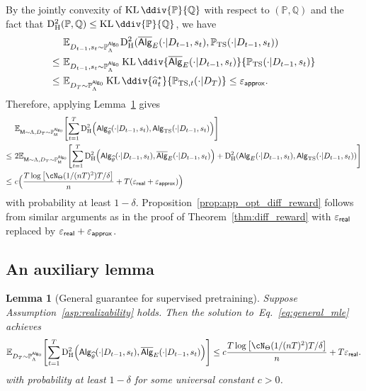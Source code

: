 \documentclass[10pt]{article}
\newtheorem{lemma}[theorem]{Lemma}
\renewcommand{\epsilon}{\varepsilon}
\newcommand{\eps}{\varepsilon}
\newcommand{\KL}{\operatorname{KL}\ddiv}
\newcommand{\<}{\left\langle}
\renewcommand{\>}{\right\rangle}
\newcommand{\paren}[1]{{\left( #1 \right)}}
\newcommand{\brac}[1]{{\left[ #1 \right]}}
\newcommand{\E}{\mathbb{E}}
\renewcommand{\P}{\mathbb{P}}
\newcommand{\Q}{\mathbb{Q}}
\newcommand{\inst}{{\mathsf{M}}}
\newcommand{\HelDs}{{\mathrm{D}^2_{\mathrm{H}}}}
\newcommand{\TS}{{\mathrm{TS}}}
\newcommand{\state}{{s}}
\newcommand{\action}{{a}}
\newcommand{\totlen}{{T}}
\newcommand{\sAlg}{{\mathsf{Alg}}}
\newcommand{\osAlg}{\overline{\mathsf{Alg}}}
\newcommand{\dset}{{D}}
\newcommand{\Numobs}{{n}}
\newcommand{\Parspace}{{\Theta}}
\newcommand{\appeps}{\eps_{{\mathsf{approx}}}}
\newcommand{\EstPar}{{\widehat{\theta}}}
\newcommand{\prior}{{\Lambda}}
\newcommand{\shortexp}{{E}}
\newcommand{\geneps}{{\epsilon}_{\sf real}}
\begin{document}
By the jointly convexity of $\KL{\P}{\Q}$ with respect to $(\P,\Q)$ and the fact that $\HelDs(\P,\Q)\leq\KL{\P}{\Q}$, we have 
\begin{align*}
  &~\E_{\dset_{t-1},\state_t\sim\P_\prior^{\sAlg_0}}\HelDs(\osAlg_{\shortexp}(\cdot|\dset_{t-1},\state_t),\P_{\TS}(\cdot|\dset_{t-1},\state_t))\\
  \leq &~
  \E_{\dset_{t-1},\state_t\sim\P_\prior^{\sAlg_0}}\KL{\osAlg_{\shortexp}(\cdot|\dset_{t-1},\state_t)}{\P_{\TS}(\cdot|\dset_{t-1},\state_t)}\\
   \leq &~
 \E_{\dset_\totlen\sim\P_{\prior}^{\sAlg_0}}\KL{\widehat\action^*_t}{\P_{\TS,t}(\cdot|\dset_\totlen)}\leq\appeps.
\end{align*} Therefore, applying Lemma~\ref{lm:general_imit} gives
 \begin{align*}
        &~\E_{\inst\sim \prior, \dset_\totlen\sim \P^{\sAlg_0}_\inst}\brac{ \sum_{t=1}^\totlen \HelDs\paren{ \sAlg_{{\EstPar}}(\cdot|\dset_{t-1},\state_t ), \sAlg_{\TS}(\cdot|\dset_{t-1},\state_t )} }\\
        \le&~
        2\E_{\inst\sim \prior, \dset_\totlen\sim \P^{\sAlg_0}_\inst}\brac{ \sum_{t=1}^\totlen \HelDs\paren{ \sAlg_{{\EstPar}}(\cdot|\dset_{t-1},\state_t ), \osAlg_{\shortexp}(\cdot|\dset_{t-1},\state_t )}+\HelDs\paren{ \sAlg_{{\shortexp}}(\cdot|\dset_{t-1},\state_t ), \sAlg_{\TS}(\cdot|\dset_{t-1},\state_t )} }\\
       \le&~
       c\Big(\frac{\totlen \log \brac{ \cN_{\Parspace}(1/(\Numobs\totlen)^2) \totlen/\delta } }{n} + \totlen(\geneps+\appeps)\Big)
    \end{align*} 
    with probability at least $1-\delta$. Proposition~\ref{prop:app_opt_diff_reward} follows from similar arguments as in the proof of Theorem~\ref{thm:diff_reward} with $\geneps$ replaced by $\geneps+\appeps$. 

\subsection{An auxiliary lemma}

\begin{lemma}[General guarantee for supervised pretraining]\label{lm:general_imit}
Suppose Assumption~\ref{asp:realizability} holds. Then  the solution to~Eq.~\eqref{eq:general_mle} achieves
\begin{align*}
\E_{\dset_\totlen\sim \P^{\sAlg_0}_\prior}\brac{ \sum_{t=1}^\totlen \HelDs\paren{ \sAlg_{{\EstPar}}(\cdot|\dset_{t-1},\state_t ), \osAlg_{\shortexp}(\cdot|\dset_{t-1},\state_t )} } \le c\frac{\totlen \log \brac{ \cN_{\Parspace}(1/(\Numobs\totlen)^2) \totlen/\delta } }{n} + \totlen\geneps.
\end{align*}
with probability at least $1-\delta$ for some universal constant $c>0$.
\end{lemma}
\end{document}
